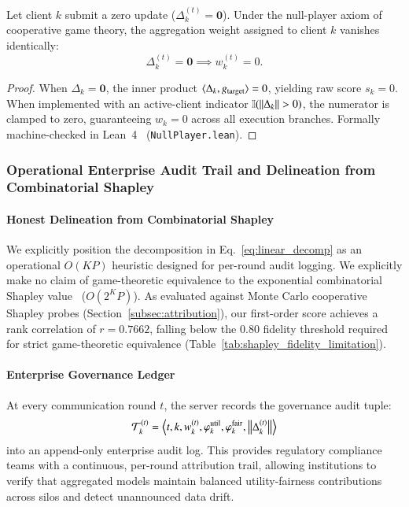 \begin{proposition}
\label{prop:null_player}
Let client $k$ submit a zero update ($\Delta_k^{(t)} = \mathbf{0}$). Under the null-player axiom of cooperative game theory, the aggregation weight assigned to client $k$ vanishes identically:
\begin{equation}
\label{eq:null_player_prop}
\Delta_k^{(t)} = \mathbf{0} \implies w_k^{(t)} = 0.
\end{equation}
\end{proposition}
\begin{proof}
When $\Delta_k = \mathbf{0}$, the inner product $\langle \Delta_k, g_{\mathrm{target}} \rangle = 0$, yielding raw score $s_k = 0$. When implemented with an active-client indicator $\mathbb{I}(\left\lVert \Delta_k \right\rVert > 0)$, the numerator is clamped to zero, guaranteeing $w_k = 0$ across all execution branches. Formally machine-checked in Lean~4~\citep{demoura2021lean} (\texttt{Null}\allowbreak\texttt{Player.lean}).
\end{proof}

\subsubsection{Operational Enterprise Audit Trail and Delineation from Combinatorial Shapley}
\paragraph{Honest Delineation from Combinatorial Shapley}
We explicitly position the decomposition in Eq.~\eqref{eq:linear_decomp} as an operational $O(KP)$ heuristic designed for per-round audit logging. We explicitly make no claim of game-theoretic equivalence to the exponential combinatorial Shapley value~\citep{shapley1953value} ($O(2^K P)$). As evaluated against Monte Carlo cooperative Shapley probes (Section~\ref{subsec:attribution}), our first-order score achieves a rank correlation of $r = 0.7662$, falling below the $0.80$ fidelity threshold required for strict game-theoretic equivalence (Table~\ref{tab:shapley_fidelity_limitation}).

\paragraph{Enterprise Governance Ledger}
At every communication round $t$, the server records the governance audit tuple:
\begin{equation}
\label{eq:audit_tuple}
\mathcal{T}_k^{(t)} = \left\langle t, k, w_k^{(t)}, \varphi_k^{\mathrm{util}}, \varphi_k^{\mathrm{fair}}, \left\lVert \Delta_k^{(t)} \right\rVert \right\rangle
\end{equation}
into an append-only enterprise audit log. This provides regulatory compliance teams with a continuous, per-round attribution trail, allowing institutions to verify that aggregated models maintain balanced utility-fairness contributions across silos and detect unannounced data drift.
